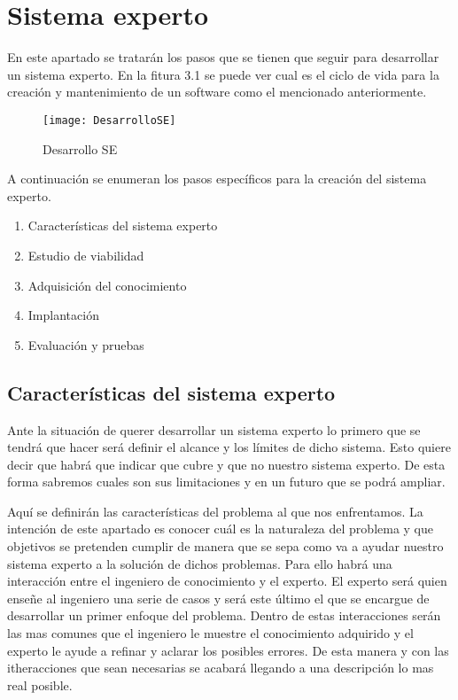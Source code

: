 \section{Sistema experto}
En este apartado se tratarán los pasos que se tienen que seguir para desarrollar un sistema experto.
 En la fitura 3.1 se puede ver cual es el ciclo de vida para la creación y mantenimiento de un software
 como el mencionado anteriormente.

\begin{figure}[htb]
  \centering
    \texttt{[image: DesarrolloSE]}
  \caption[Desarrollo SE]{Desarrollo SE}
  \label{fig:Desarrollo Sistema Experto}
\end{figure}

A continuación se enumeran los pasos específicos para la creación del sistema experto.
\begin{enumerate}
  \item Características del sistema experto
  \item Estudio de viabilidad
  \item Adquisición del conocimiento
  \item Implantación
  \item Evaluación y pruebas
\end{enumerate}

\subsection{Características del sistema experto}

Ante la situación de querer desarrollar un sistema experto lo primero que se tendrá
 que hacer será definir el alcance y los límites de dicho sistema. Esto quiere decir que
 habrá que indicar que cubre y que no nuestro sistema experto. De esta forma sabremos
 cuales son sus limitaciones y en un futuro que se podrá ampliar.


Aquí se definirán las características del problema al que nos enfrentamos.
 La intención de este apartado es conocer cuál es la naturaleza del problema
 y que objetivos se pretenden cumplir de manera que se sepa como va a ayudar
 nuestro sistema experto a la solución de dichos problemas. Para ello habrá
 una interacción entre el ingeniero de conocimiento y el experto. El experto
 será quien enseñe al ingeniero una serie de casos y será este último el que se
 encargue de desarrollar un primer enfoque del problema. Dentro de estas interacciones
 serán las mas comunes que el ingeniero le muestre el conocimiento adquirido
 y el experto le ayude a refinar y aclarar los posibles errores. De esta manera
 y con las itheracciones que sean necesarias se acabará llegando a una descripción
 lo mas real posible.

